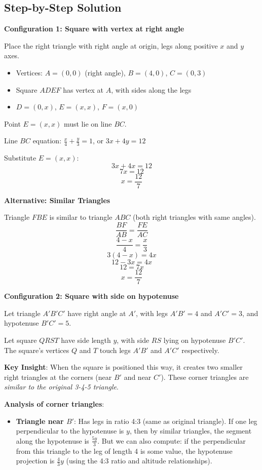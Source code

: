 \documentclass[]{article}
\begin{document}
\begin{solutionbox}
\subsection*{Step-by-Step Solution}

\textbf{Configuration 1: Square with vertex at right angle}

Place the right triangle with right angle at origin, legs along positive $x$ and $y$ axes.
\begin{itemize}
    \item Vertices: $A = (0,0)$ (right angle), $B = (4,0)$, $C = (0,3)$
    \item Square $ADEF$ has vertex at $A$, with sides along the legs
    \item $D = (0,x)$, $E = (x,x)$, $F = (x,0)$
\end{itemize}

Point $E = (x,x)$ must lie on line $BC$.

Line $BC$ equation: $\frac{x}{4} + \frac{y}{3} = 1$, or $3x + 4y = 12$

Substitute $E = (x,x)$:
\[3x + 4x = 12\]
\[7x = 12\]
\[x = \frac{12}{7}\]

\textbf{Alternative: Similar Triangles}

Triangle $FBE$ is similar to triangle $ABC$ (both right triangles with same angles).
\[\frac{BF}{AB} = \frac{FE}{AC}\]
\[\frac{4-x}{4} = \frac{x}{3}\]
\[3(4-x) = 4x\]
\[12 - 3x = 4x\]
\[12 = 7x\]
\[x = \frac{12}{7}\]

\textbf{Configuration 2: Square with side on hypotenuse}

Let triangle $A'B'C'$ have right angle at $A'$, with legs $A'B' = 4$ and $A'C' = 3$, and hypotenuse $B'C' = 5$.

Let square $QRST$ have side length $y$, with side $RS$ lying on hypotenuse $B'C'$. The square's vertices $Q$ and $T$ touch legs $A'B'$ and $A'C'$ respectively.

\textbf{Key Insight}: When the square is positioned this way, it creates two smaller right triangles at the corners (near $B'$ and near $C'$). These corner triangles are \emph{similar to the original 3-4-5 triangle}.

\textbf{Analysis of corner triangles}:
\begin{itemize}
    \item \textbf{Triangle near $B'$}: Has legs in ratio 4:3 (same as original triangle). If one leg perpendicular to the hypotenuse is $y$, then by similar triangles, the segment along the hypotenuse is $\frac{5y}{3}$. But we can also compute: if the perpendicular from this triangle to the leg of length 4 is some value, the hypotenuse projection is $\frac{4}{3}y$ (using the 4:3 ratio and altitude relationships).
    

\end{itemize}
\end{solutionbox}
\end{document}

